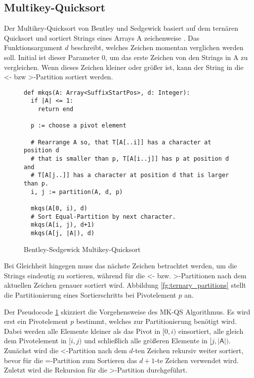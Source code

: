 \subsection{Multikey-Quicksort}
\label{section:mkqs}
Der  Multikey-Quicksort von
Bentley und Sedgewick basiert auf dem ternären Quicksort und sortiert Strings eines Arrays \textsf{A}
zeichenweise \cite{multikey_quicksort}. Das Funktionsargument $d$ beschreibt,
welches Zeichen momentan verglichen werden soll. Initial ist dieser Parameter 0,
um das erste Zeichen von den Strings in \textsf{A} zu vergleichen.
Wenn dieses Zeichen kleiner oder größer ist,
kann der String in die \glqq <\grqq- bzw \glqq >\grqq-Partition sortiert werden.

\begin{figure}
	\begin{verbatim}
def mkqs(A: Array<SuffixStartPos>, d: Integer):
  if |A| <= 1:
    return end

  p := choose a pivot element

  # Rearrange A so, that T[A[..i]] has a character at position d
  # that is smaller than p, T[A[i..j]] has p at position d and 
  # T[A[j..]] has a character at position d that is larger than p.
  i, j := partition(A, d, p)

  mkqs(A[0, i), d)
  # Sort Equal-Partition by next character.
  mkqs(A[i, j), d+1)
  mkqs(A[j, |A|), d)
	\end{verbatim}
	\caption{Bentley-Sedgewick Multikey-Quicksort~\cite{multikey_quicksort}}
	\label{alg:mkqs}
\end{figure}

Bei Gleichheit hingegen muss das nächste Zeichen betrachtet werden, um die Strings eindeutig zu sortieren,
während für die \glqq <\grqq- bzw. \glqq >\grqq-Partitionen nach dem aktuellen Zeichen genauer sortiert wird.
Abbildung \ref{fg:ternary_partitions} stellt die Partitionierung eines Sortierschritts bei Pivotelement $p$ an.

Der Pseudocode \ref{alg:mkqs} skizziert die Vorgehensweise des MK-QS Algorithmus.
Es wird erst ein Pivotelement $p$ bestimmt, welches zur Partitionierung benötigt wird.
Dabei werden alle Elemente kleiner als das Pivot in $[0, i)$ einsortiert,
alle gleich dem Pivotelement in $[i, j)$ und schließlich alle größeren Elemente in $[j, |\textsf{A}|)$.
Zunächst wird die \glqq <\grqq-Partition nach dem $d$-ten Zeichen rekursiv weiter sortiert,
bevor für die \glqq =\grqq-Partition zum Sortieren das $d+1$-te Zeichen verwendet wird.
Zuletzt wird die Rekursion für die \glqq >\grqq-Partition durchgeführt.

